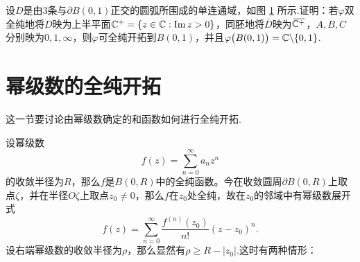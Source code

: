\begin{xiti}
\begin{figure}[!ht]
       \caption{\label{fig6.8}}
     \end{figure}
  \item \hypertarget{xiti6.1.11}{} 设$D$是由$3$条与$\partial B(0,1)$正交的圆弧所围成的单连通域，如图 \ref{fig6.8} 所示.证明：若$\varphi$双全纯地将$D$映为上半平面$\mathbb C^+=\{z\in\mathbb C:\operatorname{Im} z>0\}$，同胚地将$\bar D$映为${}\mkern2mu\overline{\mkern-2mu\mathbb C^+}$，$A,B,C$分别映为$0,1,\infty$，则$\varphi$可全纯开拓到$B(0,1)$，并且$\varphi\big(B(0,1)\big)=\mathbb C\backslash\{0,1\}$.
\end{xiti}

\section{幂级数的全纯开拓\label{sec6.2}}
这一节要讨论由幂级数确定的和函数如何进行全纯开拓.

设幂级数
\begin{equation}\label{eq6.2.1}
  f(z) = \sum_{n=0}^\infty a_nz^n
\end{equation}
的收敛半径为$R$，那么$f$是$B(0,R)$中的全纯函数。今在收敛圆周$\partial B(0,R)$上取点$\zeta$，并在半径$O\zeta$上取点$z_0\ne0$，那么$f$在$z_0$处全纯，故在$z_0$的邻域中有幂级数展开式
\begin{equation}\label{eq6.2.2}
  f(z) = \sum_{n=0}^\infty\frac{f^{(n)}(z_0)}{n!}(z-z_0)^n.
\end{equation}
设右端幂级数的收敛半径为$\rho$，那么显然有$\rho\ge R-|z_0|$.这时有两种情形：

